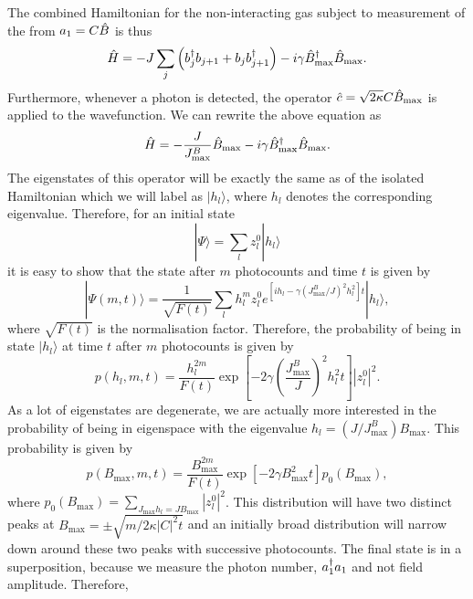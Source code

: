The combined Hamiltonian for the non-interacting gas subject to
measurement of the from $a_1 = C \hat{B}$ is thus
\begin{equation}
  \hat{H} = -J \sum_j \left( b^\dagger_j b_{j+1} + b_j b^\dagger_{j+1} \right) - i
  \gamma \hat{B}_\mathrm{max}^\dagger \hat{B}_\mathrm{max}.
\end{equation} 
Furthermore, whenever a photon is detected, the operator
$\hat{c} = \sqrt{2 \kappa} C \hat{B}_\mathrm{max}$ is applied to the wavefunction. We can
rewrite the above equation as
\begin{equation}
  \hat{H} = -\frac{J}{J^B_\mathrm{max}} \hat{B}_\mathrm{max} - i \gamma \hat{B}_\mathrm{max}^\dagger \hat{B}_\mathrm{max}.
\end{equation}
The eigenstates of this operator will be exactly the same as of the
isolated Hamiltonian which we will label as $| h_l \rangle$, where
$h_l$ denotes the corresponding eigenvalue. Therefore, for an initial
state
\begin{equation}
  | \Psi \rangle = \sum_l z_l^0 | h_l \rangle
\end{equation}
it is easy to show that the state after $m$ photocounts and time $t$
is given by
\begin{equation}
  | \Psi (m,t) \rangle = \frac{1}{\sqrt{F(t)}} \sum_l h_l^m z_l^0 e^{[i h_l -
    \gamma(J^B_\mathrm{max}/J)^2 h_l^2]t} | h_l \rangle,
\end{equation}
where $\sqrt{F(t)}$ is the normalisation factor. Therefore, the probability
of being in state $| h_l \rangle$ at time $t$ after $m$ photocounts is
given by
\begin{equation}
  p(h_l, m, t) = \frac{h_l^{2m}} {F(t)} \exp\left[ - 2 \gamma \left(
    \frac{J^B_\mathrm{max}} {J} \right)^2 h_l^2 t \right] |z_l^0|^2.
\end{equation}
As a lot of eigenstates are degenerate, we are actually more
interested in the probability of being in eigenspace with the
eigenvalue $h_l = (J/J^B_\mathrm{max})B_\mathrm{max}$. This probability
is given by
\begin{equation}
  \label{eq:bmax}
  p(B_\mathrm{max}, m, t) = \frac{B_\mathrm{max}^{2m}} {F(t)} \exp\left[ - 2
    \gamma B_\mathrm{max}^2 t \right] p_0 (B_\mathrm{max}),
\end{equation}
where
$p_0(B_\mathrm{max}) = \sum_{J_\mathrm{max} h_l = J B_\mathrm{max}}
|z_l^0|^2$. This distribution will have two distinct peaks at
$B_\mathrm{max} = \pm \sqrt{m/2\kappa |C|^2 t}$ and an initially broad
distribution will narrow down around these two peaks with successive
photocounts. The final state is in a superposition, because we measure
the photon number, $a^\dagger_1 a_1$ and not field amplitude. Therefore,
